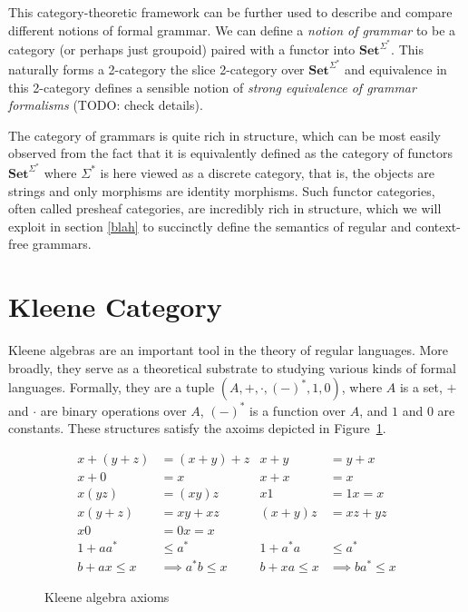 \documentclass[sigconf,anonymous,review,screen]{acmart}
\newcommand{\Set}{\mathbf{Set}}
\newif\ifdraft
\newcommand{\steven}[1]{\ifdraft{\color{orange}[{\bf Steven}: #1]}\fi}
\begin{document}
This category-theoretic framework can be further used to describe and
compare different notions of formal grammar. We can define a
\emph{notion of grammar} to be a category (or perhaps just groupoid)
paired with a functor into $\Set^{\Sigma^*}$. This naturally forms a
2-category the slice 2-category over $\Set^{\Sigma^*}$ and equivalence
in this 2-category defines a sensible notion of \emph{strong
equivalence of grammar formalisms} (TODO: check details).

The category of grammars is quite rich in structure, which can be most
easily observed from the fact that it is equivalently defined as the
category of functors $\Set^{\Sigma^*}$ where $\Sigma^*$ is here viewed
as a discrete category, that is, the objects are strings and only
morphisms are identity morphisms. Such functor categories, often
called presheaf categories, are incredibly rich in structure, which we
will exploit in section \ref{blah} to succinctly define the semantics
of regular and context-free grammars. \steven{Topoi model dependent type theory. This dependence is seemingly useful for also reasoning about context sensitivity, but this doesn't work for \textit{reasons}, right?}

\section{Kleene Category}

Kleene algebras are an important tool in the theory of regular
languages. More broadly, they serve as a theoretical substrate to
studying various kinds of formal languages. Formally, they are a tuple
$(A, +, \cdot, (-)^*, 1, 0)$, where $A$ is a set, $+$ and $\cdot$
are binary operations over $A$, $(-)^*$ is a function over $A$, and
$1$ and $0$ are constants. These structures satisfy the axoims depicted
in Figure~\ref{fig:axioms}.

\begin{figure}
  \begin{align*}
    x + (y + z) &= (x + y) + z & x + y &= y + x\\
    x + 0 &= x & x + x &= x\\
    x(yz) &= (xy)z & x1 &= 1x = x\\
    x(y + z) &= xy + xz & (x + y)z &= xz + yz\\
    x0 &= 0x = x & & \\
    1 + aa^* &\leq a^* & 1 + a^*a &\leq a^*\\
     b + ax \leq x &\implies a^*b \leq x &  b + xa \leq x &\implies ba^* \leq x
  \end{align*}
  \label{fig:axioms}
  \caption{Kleene algebra axioms}
\end{figure}
\end{document}
